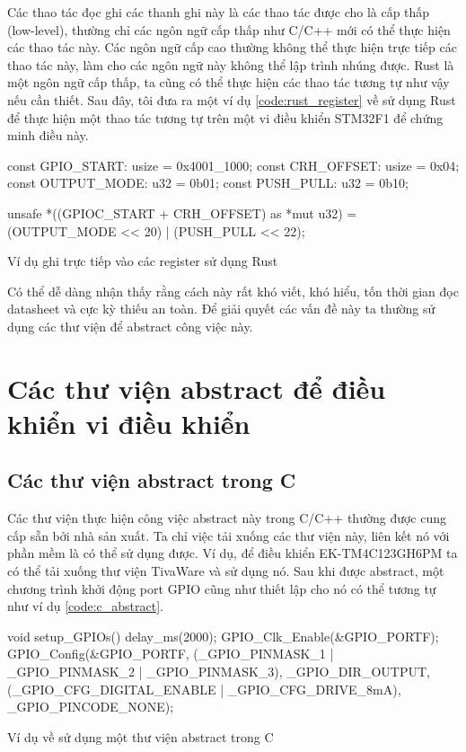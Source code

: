Các thao tác đọc ghi các thanh ghi này là các thao tác được cho là cấp thấp (low-level), thường chỉ các ngôn ngữ cấp thấp như C/C++ mới có thể thực hiện các thao tác này.
Các ngôn ngữ cấp cao thường không thể thực hiện trực tiếp các thao tác này, làm cho các ngôn ngữ này không thể lập trình nhúng được.
Rust là một ngôn ngữ cấp thấp,  ta cũng có thể thực hiện các thao tác tương tự như vậy nếu cần thiết.
Sau đây, tôi đưa ra một ví dụ \ref{code:rust_register} về sử dụng Rust để thực hiện một thao tác tương tự trên một vi điều khiển STM32F1 để chứng minh điều này.
\begin{listing}[ht]
\begin{rustcode}
const GPIO_START: usize = 0x4001_1000;
const CRH_OFFSET: usize = 0x04;
const OUTPUT_MODE: u32 = 0b01;
const PUSH_PULL: u32 = 0b10;

unsafe {
    *((GPIOC_START + CRH_OFFSET) as *mut u32) = (OUTPUT_MODE << 20) | (PUSH_PULL << 22);
}
\end{rustcode}
\caption{Ví dụ ghi trực tiếp vào các register sử dụng Rust}
\label{code:rust_register}
\end{listing}

Có thể dễ dàng nhận thấy rằng cách này rất khó viết, khó hiểu, tốn thời gian đọc datasheet và cực kỳ thiếu an toàn.
Để giải quyết các vấn đề này ta thường sử dụng các thư viện để abstract công việc này.
\section{Các thư viện abstract để điều khiển vi điều khiển}
\subsection{Các thư viện abstract trong C}
Các thư viện thực hiện công việc abstract này trong C/C++ thường được cung cấp sẵn bởi nhà sản xuất.
Ta chỉ việc tải xuống các thư viện này, liên kết nó với phần mềm là có thể sử dụng được.
Ví dụ, để điều khiển EK-TM4C123GH6PM ta có thể tải xuống thư viện TivaWare \cite{tivac_tivaware} và sử dụng nó.
Sau khi được abstract, một chương trình khởi động port GPIO cũng như thiết lập cho nó có thể tương tự như ví dụ \ref{code:c_abstract}.
\begin{listing}[ht]
\begin{ccode}
void setup_GPIOs()
{
     delay_ms(2000);
     GPIO_Clk_Enable(&GPIO_PORTF);
     GPIO_Config(&GPIO_PORTF,
                 (_GPIO_PINMASK_1 | _GPIO_PINMASK_2 | _GPIO_PINMASK_3),
                 _GPIO_DIR_OUTPUT,
                 (_GPIO_CFG_DIGITAL_ENABLE | _GPIO_CFG_DRIVE_8mA),
                 _GPIO_PINCODE_NONE);
}
\end{ccode}
\caption{Ví dụ về sử dụng một thư viện abstract trong C}
\label{code:c_abstract}
\end{listing}

